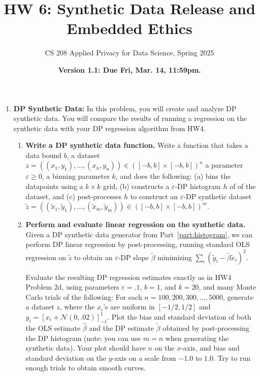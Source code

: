 \documentclass[11pt]{article}
\title{\vspace{-1.5cm} HW 6: Synthetic Data Release and Embedded Ethics}
\author{CS 208 Applied Privacy for Data Science, Spring 2025}
\date{\textbf{Version 1.1: Due Fri, Mar. 14, 11:59pm.}}
\begin{document}
\maketitle

\instructions

\begin{enumerate}[leftmargin=*] 

\item \textbf{DP Synthetic Data:}
        In this problem, you will create and analyze DP synthetic data. 
        You will compare the results of running a regression on the synthetic data with your DP regression algorithm from HW4.

 

        \begin{enumerate}
            \item \textbf{Write a DP synthetic data function.}
            Write a function that takes a data bound $b$, a dataset $z=((x_1,y_1),\ldots,(x_n,y_n))\in ([-b,b]\times [-b,b])^n$
            a parameter $\varepsilon\geq 0$, a binning parameter $k$, and
            does the following:
            (a) bins the datapoints using a $k\times k$ grid, (b) constructs a $\varepsilon$-DP histogram $h$ of of the dataset, and (c) post-processes $h$ to construct an $\varepsilon$-DP synthetic dataset $\tilde{z} = ((\tilde{x}_1,\tilde{y}_1),\ldots,(\tilde{x}_m,\tilde{y}_m))
            \in ([-b,b]\times [-b,b])^m$.  
            \label{part:histogram}

            \item \textbf{Perform and evaluate linear regression on the synthetic data.} 
            Given a
            DP synthetic data generator from Part~\ref{part:histogram}, we can
            perform DP linear regression by post-processing, running
            standard OLS regression on $\tilde{z}$ to 
            obtain an $\varepsilon$-DP slope $\tilde{\beta}$ minimizing 
            $\sum_i (\tilde{y}_i-\tilde{\beta}\tilde{x}_i)^2$.

        Evaluate the resulting DP regression estimates exactly as in HW4                Problem 2d, using parameters $\varepsilon=.1$, $b=1$, and $k=20$, and              many Monte Carlo trials of the following:
           For each $n=100,200,300,\ldots,5000$, 
            generate a dataset $z$, where the 
            $x_i$'s are uniform in $[-1/2,1/2]$ and 
            $y_i = \left[x_i + \mathcal{N}(0,.02)\right]_{-1}^{1}.$
            Plot the bias and standard deviation of both the OLS estimate $\hat{\beta}$ and the DP estimate $\tilde{\beta}$ obtained by
            post-processing the DP histogram (note: you can use $m=n$ when generating the synthetic data).  
            Your plot should have $n$ on the $x$-axis, and bias and standard deviation on the $y$-axis on a scale from $-1.0$ to $1.0$.
            Try to run enough trials to obtain smooth curves.


\end{enumerate}
\end{enumerate}
\end{document}
